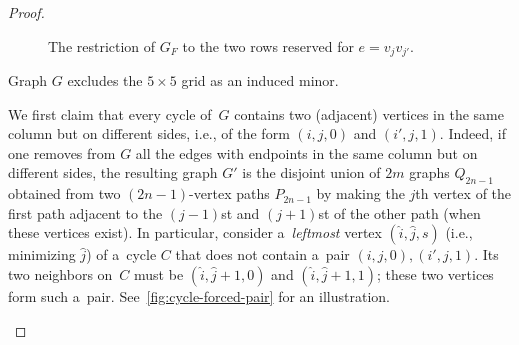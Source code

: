 \documentclass[a4paper,UKenglish,cleveref,autoref]{lipics-v2021}
\begin{document}
\begin{proof}
\begin{figure}[!ht]
\caption{The restriction of $G_F$ to the two rows reserved for $e=v_jv_{j'}$.}
\label{fig:edge-gadget}
\end{figure}

  \begin{claim}
\leavevmode
Graph $G$ excludes the $5 \times 5$ grid as an induced minor.
  \end{claim}
\begin{claimproof}
\leavevmode
We first claim that every cycle of~$G$ contains two (adjacent) vertices in the same column but on different sides, i.e., of the form $(i,j,0)$ and $(i',j,1)$.
    Indeed, if one removes from $G$ all the edges with endpoints in the same column but on different sides, the resulting graph $G'$ is the disjoint union of $2m$ graphs $Q_{2n-1}$ obtained from two $(2n-1)$-vertex paths $P_{2n-1}$ by making the $j$th vertex of the first path adjacent to the $(j-1)$st and $(j+1)$st of the other path (when these vertices exist).
    In particular, consider a~\emph{leftmost} vertex $(\widehat{i},\widehat{j},s)$ (i.e., minimizing $\widehat{j}$) of a~cycle $C$ that does not contain a~pair $(i,j,0), (i',j,1)$. Its two neighbors on~$C$ must be $(\widehat{i},\widehat{j}+1,0)$ and $(\widehat{i},\widehat{j}+1,1)$; these two vertices form such a~pair.
    See~\cref{fig:cycle-forced-pair} for an illustration.


\end{claimproof}
\end{proof}
\end{document}
